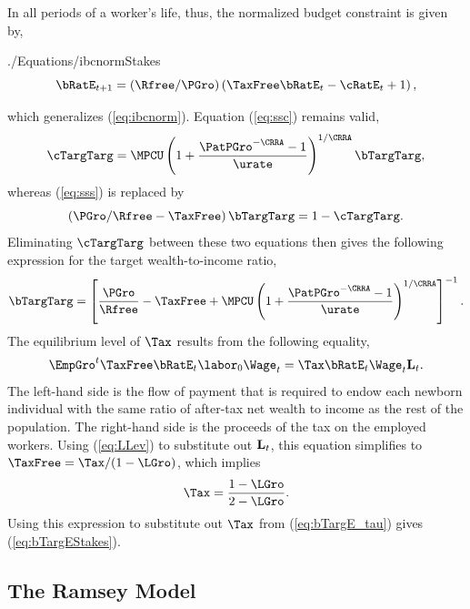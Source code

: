 \documentclass[titlepage]{\econtex}\newcommand{\texname}{cjSOE}
\begin{document}
In all periods of a worker's life, thus, the normalized budget constraint is given by,
\begin{verbatimwrite}{./Equations/ibcnormStakes}
\begin{equation}
\bRatE_{t+1} = (\Rfree /\PGro) \left(\TaxFree \bRatE_{t} -\cRatE_{t}+1\right),
\label{eq:ibcnormStakes}
\end{equation}
\end{verbatimwrite}

which generalizes (\ref{eq:ibcnorm}). Equation (\ref{eq:ssc}) remains valid,
\begin{equation*}
\cTargTarg = \MPCU \left(1+\frac{\PatPGro^{-\CRRA}-1}{\urate}\right)^{1/\CRRA} \bTargTarg,
\end{equation*}
whereas (\ref{eq:sss}) is replaced by
\begin{equation*}
\left(\PGro/\Rfree-\TaxFree \right) \bTargTarg = 1 -\cTargTarg.
\end{equation*}
Eliminating $\cTargTarg$ between these two equations then gives the following expression for the target wealth-to-income ratio,
\begin{equation}
 \bTargTarg= \left[\frac{\PGro}{\Rfree}-\TaxFree+\MPCU \left(1+\frac{\PatPGro^{-\CRRA}-1}{\urate}\right)^{1/\CRRA}\right]^{-1}.
\label{eq:bTargE_tau}
\end{equation}
The equilibrium level of $\Tax$ results from the following equality,
\begin{equation*}
\EmpGro^t \TaxFree \bRatE_t \labor_0 \Wage_t  = \Tax \bRatE_t \Wage_t \LLev_t.
\label{eq:gbc}
\end{equation*}
The left-hand side is the flow of payment that is required to endow each newborn individual with the same ratio of after-tax net wealth to income as the rest of the population. The right-hand side is the proceeds of the tax on the employed workers. Using (\ref{eq:LLev}) to substitute out $\mathbf{L}_t$, this equation simplifies to $\TaxFree = \Tax / (1-
\LGro)$, which implies
\begin{equation}
\Tax=\frac{1-\LGro}{2-\LGro}.
\label{eq:tau}
\end{equation}
Using this expression to substitute out $\Tax$ from (\ref{eq:bTargE_tau}) gives (\ref{eq:bTargEStakes}).

\medskip
% 

\subsection{The Ramsey Model}
\end{document}
